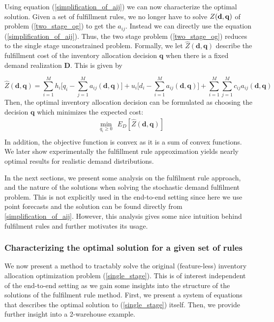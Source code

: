 \documentclass[poms,final,blindrev]{poms1_V1} %
\newcommand{\q}[0]{{\mathbf{q}}}
\renewcommand{\d}[0]{{\mathbf{d}}}
\begin{document}
Using equation (\ref{simplification_of_aij}) we can now characterize the optimal solution. %
Given a set of fulfillment rules, we no longer have to solve $Z({\bf d},{\bf q})$ of problem (\ref{two_stage_og}) to get the $a_{ij}$. Instead we can directly use the equation (\ref{simplification_of_aij}). Thus, the two stage problem (\ref{two_stage_og}) reduces to the single stage unconstrained problem. Formally, we let $\hat{Z}(\d, \q)$ describe the fulfillment cost of the inventory allocation decision $\mathbf{q}$ when there is a fixed demand realization $\mathbf{D}$. This is given by 

\begin{equation}
    \hat{Z}(\mathbf{d}, \mathbf{q}) = \sum_{i=1}^{M}  h_i \big[ q_i - \sum_{j=1}^{M} a_{ij}(\d,\q) \big]   +  u_{i} \big[ d_i - \sum_{i=1}^{M}  a_{ij}(\d, \q)\big] + \sum_{i=1}^M \sum_{j=1}^{M}    c_{ij} a_{ij}(\d, \q)
\end{equation}
Then, the optimal inventory allocation decision can be formulated as choosing the decision $\mathbf{q}$ which minimizes the expected cost:
\begin{equation}
\label{single_stage}
\begin{aligned}
&\min_{q_i \geq 0} \ \
 E_{D} [\hat{Z}(\mathbf{d}, \mathbf{q})
] \\
\end{aligned}
\end{equation}
In addition, the objective function is convex as it is a sum of convex functions. We later show experimentally the fulfillment rule approximation yields nearly optimal results for realistic demand distributions. 

In the next sections, we present some analysis on the fulfilment rule approach, and the nature of the solutions when solving the stochastic demand fulfilment problem. This is not explicitly used in the end-to-end setting since here we use point forecasts and the solution can be found directly from \eqref{simplification_of_aij}. However, this analysis gives some nice intuition behind fulfilment rules and further motivates its usage. 

\subsubsection{Characterizing the optimal solution for a given set of rules}
\label{sec:characterize}
 We now present a method to tractably solve the original (feature-less) inventory allocation optimization problem (\ref{single_stage}). This is of interest independent of the end-to-end setting as we gain some insights into the structure of the solutions of the fulfilment rule method. First, we 
present a system of equations that describes the optimal solution to (\ref{single_stage}) itself. Then, we provide further insight into a 2-warehouse example.
\end{document}
